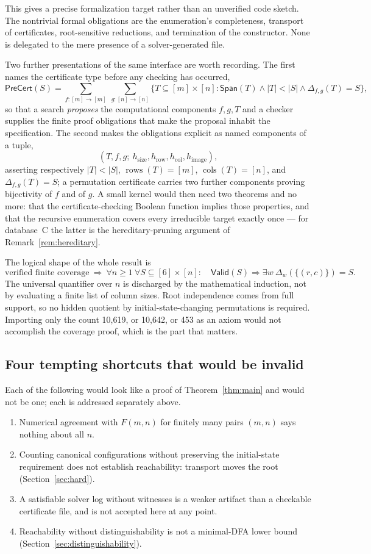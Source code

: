 \documentclass[11pt,letterpaper]{article}
\numberwithin{equation}{section}
\theoremstyle{definition}
\theoremstyle{remark}
\newcommand{\suppR}{\operatorname{rows}}
\newcommand{\suppC}{\operatorname{cols}}
\newcommand{\Valid}{\mathsf{Valid}}
\newcommand{\Span}{\mathsf{Span}}
\newcommand{\PreCert}{\mathsf{PreCert}}
\newcommand{\dbC}{\textsf{C}}
\begin{document}
This gives a precise formalization target rather than an unverified code
sketch. The nontrivial formal obligations are the enumeration's
completeness, transport of certificates, root-sensitive reductions, and
termination of the constructor. None is delegated to the mere presence
of a solver-generated file.

Two further presentations of the same interface are worth recording. The
first names the certificate type before any checking has occurred,
\[
 \PreCert(S)=
 \sum_{f:[m]\to[m]}\ \sum_{g:[n]\to[n]}
 \bigl\{T\subseteq[m]\times[n]:
   \Span(T)\wedge|T|<|S|\wedge\Delta_{f,g}(T)=S\bigr\},
\]
so that a search \emph{proposes} the computational components $f,g,T$ and a
checker supplies the finite proof obligations that make the proposal inhabit
the specification. The second makes the obligations explicit as named
components of a tuple,
\[
 (T,f,g;\ h_{\mathrm{size}},h_{\mathrm{row}},h_{\mathrm{col}},
  h_{\mathrm{image}}),
\]
asserting respectively $|T|<|S|$, $\suppR(T)=[m]$, $\suppC(T)=[n]$, and
$\Delta_{f,g}(T)=S$; a permutation certificate carries two further
components proving bijectivity of $f$ and of $g$. A small kernel would then
need two theorems and no more: that the certificate-checking Boolean function
implies those properties, and that the recursive enumeration covers every
irreducible target exactly once --- for database~\dbC{} the latter is the
hereditary-pruning argument of Remark~\ref{rem:hereditary}.

The logical shape of the whole result is
\[
 \text{verified finite coverage}
 \ \Longrightarrow\
 \forall n\ge1\ \forall S\subseteq[6]\times[n]:
 \quad\Valid(S)\Longrightarrow\exists w\ \Delta_w(\{(r,c)\})=S .
\]
The universal quantifier over $n$ is discharged by the mathematical
induction, not by evaluating a finite list of column sizes. Root independence
comes from full support, so no hidden quotient by initial-state-changing
permutations is required. Importing only the count 10,619, or 10,642, or 453
as an axiom would not accomplish the coverage proof, which is the part that
matters.

\subsection{Four tempting shortcuts that would be invalid}
Each of the following would look like a proof of Theorem~\ref{thm:main} and
would not be one; each is addressed separately above.
\begin{enumerate}[label=\arabic*.]
\item Numerical agreement with $F(m,n)$ for finitely many pairs $(m,n)$ says
nothing about all $n$.
\item Counting canonical configurations without preserving the
initial-state requirement does not establish reachability: transport moves
the root (Section~\ref{sec:hard}).
\item A satisfiable solver log without witnesses is a weaker artifact than a
checkable certificate file, and is not accepted here at any point.
\item Reachability without distinguishability is not a minimal-DFA lower
bound (Section~\ref{sec:distinguishability}).
\end{enumerate}
\end{document}

